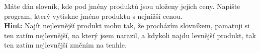 \question[50]
Máte dán slovník, kde pod jmény produktů jsou uloženy jejich ceny. Napište
program, který vytiskne jméno produktu s nejnižší cenou.\\
\textbf{Hint:} Najít nejlevnější produkt mohu tak, že procházím slovníkem,
pamatuji si ten zatím nejlevnější, na který jsem narazil, a kdykoli najdu
levnější produkt, tak ten zatím nejlevnější změním na tenhle.